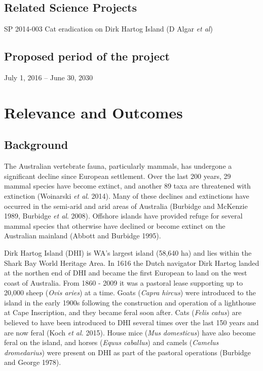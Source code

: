 \documentclass[version=last,
    paper=a4,                               %
    10pt,                                   %
    dvipsnames,
    oneside,                              %
    headings=openany,                       %
    open=any,
    BCOR=7mm,                               %
    DIV=15,     %
]{scrbook}
\begin{document}
\subsection*{Related Science Projects}

SP 2014-003 Cat eradication on Dirk Hartog Island (D Algar \emph{et al})


\subsection*{Proposed period of the project}
July 1, 2016 -- June 30, 2030



\section*{Relevance and Outcomes}


\subsection*{Background}

The Australian vertebrate fauna, particularly mammals, has undergone a
significant decline since European settlement. Over the last 200 years,
29 mammal species have become extinct, and another 89 taxa are
threatened with extinction (Woinarski \emph{et al}. 2014). Many of these
declines and extinctions have occurred in the semi-arid and arid areas
of Australia (Burbidge and McKenzie 1989, Burbidge \emph{et al}. 2008).
Offshore islands have provided refuge for several mammal species that
otherwise have declined or become extinct on the Australian mainland
(Abbott and Burbidge 1995).

Dirk Hartog Island (DHI) is WA's largest island (58,640 ha) and lies
within the Shark Bay World Heritage Area. In 1616 the Dutch navigator
Dirk Hartog landed at the northen end of DHI and became the first
European to land on the west coast of Australia. From 1860 - 2009 it was
a pastoral lease supporting up to 20,000 sheep (\emph{Ovis aries}) at a
time. Goats (\emph{Capra hircus}) were introduced to the island in the
early 1900s following the construction and operation of a lighthouse at
Cape Inscription, and they became feral soon after. Cats (\emph{Felis
catus}) are believed to have been introduced to DHI several times over
the last 150 years and are now feral (Koch \emph{et al.} 2015). House
mice (\emph{Mus} \emph{domesticus}) have also become feral on the
island, and horses (\emph{Equus caballus}) and camels (\emph{Camelus
dromedarius}) were present on DHI as part of the pastoral operations
(Burbidge and George 1978).
\end{document}
